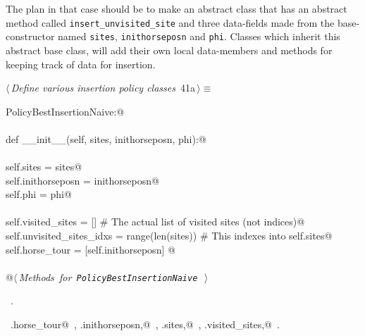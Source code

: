 \documentclass[11.5pt]{report}
\begin{document}
The plan in that case should be to make an abstract class that 
has an abstract method called \texttt{insert\_unvisited\_site}
and three data-fields made from the base-constructor named \texttt{sites}, \texttt{inithorseposn}
and \texttt{phi}. Classes which inherit this abstract base class, will 
add their own local data-members and methods for keeping track of 
data for insertion. 

\begin{flushleft} \small\label{scrap45}\raggedright\small
{} $\langle\,${\itshape Define various insertion policy classes}\nobreak\ {\footnotesize {41a}}$\,\rangle\equiv$
\vspace{-1ex}
\begin{list}{}{} \item
\mbox{}\verb@class PolicyBestInsertionNaive:@\\
\mbox{}\verb@@\\
\mbox{}\verb@    def __init__(self, sites, inithorseposn, phi):@\\
\mbox{}\verb@@\\
\mbox{}\verb@         self.sites           = sites@\\
\mbox{}\verb@         self.inithorseposn   = inithorseposn@\\
\mbox{}\verb@         self.phi             = phi@\\
\mbox{}\verb@@\\
\mbox{}\verb@         self.visited_sites        = []                # The actual list of visited sites (not indices)@\\
\mbox{}\verb@         self.unvisited_sites_idxs = range(len(sites)) # This indexes into self.sites@\\
\mbox{}\verb@         self.horse_tour           = [self.inithorseposn]         @\\
\mbox{}\verb@@\\
\mbox{}\verb@    @\hbox{$\langle\,${\itshape Methods for \verb|PolicyBestInsertionNaive|}\nobreak\ {\footnotesize {}}$\,\rangle$}\verb@@\\
\mbox{}\verb@@{\NWsep}
\end{list}
\vspace{-1.5ex}
\footnotesize
\begin{list}{}{\setlength{\itemsep}{-\parsep}\setlength{\itemindent}{-\leftmargin}}
\item \NWtxtMacroRefIn\ .
\item \NWtxtIdentsDefed\nobreak\  \verb@self.horse_tour@\nobreak\ , \verb@self.inithorseposn,@\nobreak\ , \verb@self.sites,@\nobreak\ , \verb@self.visited_sites,@\nobreak\ .
\item{}
\end{list}
\vspace{4ex}
\end{flushleft}
\end{document}

